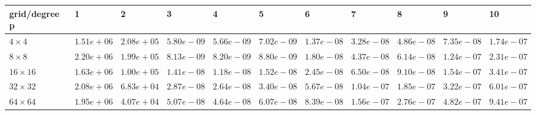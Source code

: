 \begin{tabular}{lllllllllll}
\hline
 grid/degree p   & 1          & 2          & 3          & 4          & 5          & 6          & 7          & 8          & 9          & 10         \\
\hline
 $4 \times 4$    & $1.51e+06$ & $2.08e+05$ & $5.80e-09$ & $5.66e-09$ & $7.02e-09$ & $1.37e-08$ & $3.28e-08$ & $4.86e-08$ & $7.35e-08$ & $1.74e-07$ \\
 $8 \times 8$    & $2.20e+06$ & $1.99e+05$ & $8.13e-09$ & $8.20e-09$ & $8.80e-09$ & $1.80e-08$ & $4.37e-08$ & $6.14e-08$ & $1.24e-07$ & $2.31e-07$ \\
 $16 \times 16$  & $1.63e+06$ & $1.00e+05$ & $1.41e-08$ & $1.18e-08$ & $1.52e-08$ & $2.45e-08$ & $6.50e-08$ & $9.10e-08$ & $1.54e-07$ & $3.41e-07$ \\
 $32 \times 32$  & $2.08e+06$ & $6.83e+04$ & $2.87e-08$ & $2.64e-08$ & $3.40e-08$ & $5.67e-08$ & $1.04e-07$ & $1.85e-07$ & $3.22e-07$ & $6.01e-07$ \\
 $64 \times 64$  & $1.95e+06$ & $4.07e+04$ & $5.07e-08$ & $4.64e-08$ & $6.07e-08$ & $8.39e-08$ & $1.56e-07$ & $2.76e-07$ & $4.82e-07$ & $9.41e-07$ \\
\hline
\end{tabular}